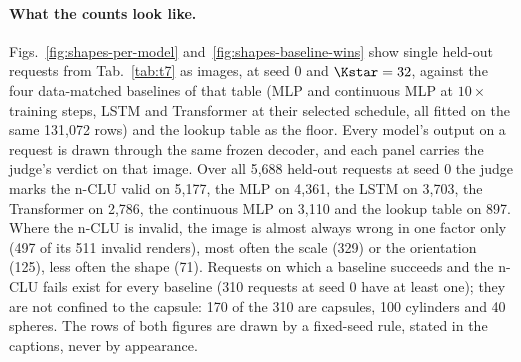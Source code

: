 \paragraph{What the counts look like.} Figs.~\ref{fig:shapes-per-model} and~\ref{fig:shapes-baseline-wins}
show single held-out requests from Tab.~\ref{tab:t7} as images, at seed 0 and $\Kstar=32$, against the %
four data-matched baselines of that table (MLP and continuous MLP at $10\times$ training steps, LSTM and
Transformer at their selected schedule, all fitted on the same 131,072 rows) and the lookup table as the %
floor. Every model's output on a request is drawn through the same frozen decoder, and each panel
carries the judge's verdict on that image. Over all 5,688 held-out requests at seed 0 the judge marks %
the n-CLU valid on 5,177, the MLP on 4,361, the LSTM on 3,703, the Transformer on 2,786, the continuous %
MLP on 3,110 and the lookup table on 897. %
Where the n-CLU is invalid, the image is almost always wrong in one factor only (497 of its 511 invalid %
renders), most often the scale (329) or the orientation (125), less often the shape (71). %
Requests on which a baseline succeeds and the n-CLU fails exist for every baseline (310 requests at %
seed 0 have at least one); they are not confined to the capsule: 170 of the 310 are capsules, 100 %
cylinders and 40 spheres. %
The rows of both figures are drawn by a fixed-seed rule, stated in the captions, never by appearance.

